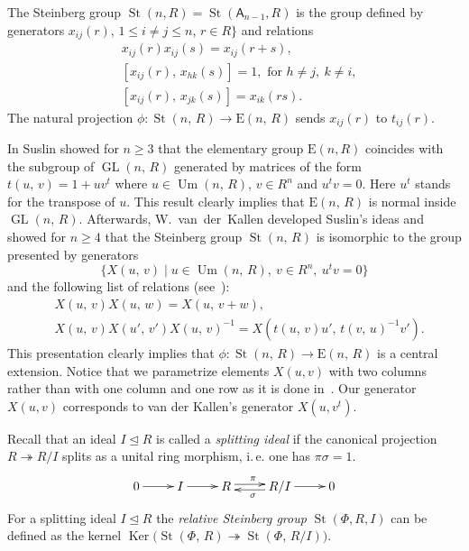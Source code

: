 \documentclass[11pt]{amsart}
\theoremstyle{plain} \declaretheorem[name=Theorem, Refname={Theorem,Theorems}]{tm} \Crefname{tm}{Theorem}{Theorems}
\numberwithin{equation}{section}
\theoremstyle{definition} \newtheorem{df}[lm]{Definition} \Crefname{df}{Definition}{Definitions}
\theoremstyle{remark} \newtheorem{rk}[lm]{Remark} \Crefname{rk}{Remark}{Remarks}
\newcommand{\Ker}{\mathop{\mathrm{Ker}}\nolimits}
\newcommand{\E}{{\mathrm{E}}}
\newcommand{\Um}{\mathop{\mathrm{Um}}\nolimits}
\newcommand{\St}{\mathop{\mathrm{St}}\nolimits}
\newcommand{\GL}{\mathop{\mathrm{GL}}\nolimits}
\newcommand{\epi}{\twoheadrightarrow}
\newcommand{\inv}{^{-1}}
\newcommand{\rA}{\mathsf{A}}
\begin{document}
The Steinberg group $\St(n, R) = \St(\rA_{n-1}, R)$ is the group defined by generators
$x_{ij}(r)$, $1\leq i\neq j\leq n$, $r\in R\}$ and relations
\setcounter{equation}{0}
\renewcommand{\theequation}{S\arabic{equation}}
\begin{align}
&x_{ij}(r)x_{ij}(s)=x_{ij}(r+s), \label{add0}\\
&[x_{ij}(r),\,x_{hk}(s)]=1,\text{ for }h\neq j,\ k\neq i, \label{ccf1}\\
&[x_{ij}(r),\,x_{jk}(s)]=x_{ik}(rs) \label{ccf2}.
\end{align}
The natural projection $\phi\colon\St(n,\,R)\rightarrow\E(n,\,R)$ sends $x_{ij}(r)$ to $t_{ij}(r)$.

In \cite{Sus} Suslin showed for $n\geq 3$ that the elementary group $\E(n, R)$ coincides with the subgroup of $\GL(n,\,R)$ generated by matrices
of the form $t(u,\,v)=1+uv^t$ where $u\in\Um(n,\,R)$, $v\in R^n$ and $u^tv=0$. Here $u^t$ stands for the transpose of $u$.
This result clearly implies that $\E(n,\,R)$ is normal inside $\GL(n,\,R)$.
Afterwards, W.~van~der~Kallen developed Suslin's ideas and showed for $n\geq4$ that the Steinberg group $\St(n,\,R)$ is isomorphic to the group presented by generators
$$\{X(u,\,v)\mid u\in\Um(n,\,R),\ v\in R^n,\ u^tv=0\}$$ and the following list of relations (see~\cite[Theorem~1]{vdK}):
\setcounter{equation}{0} \renewcommand{\theequation}{K\arabic{equation}}
\begin{align}
&X(u,\,v)X(u,\,w)=X(u,\,v+w), \label{add1} \\
&X(u,\,v)X(u',\,v')X(u,\,v)\inv=X(t(u,\,v)u',\,t(v,\,u)\inv v'). \label{conj1}
\end{align}
This presentation clearly implies that $\phi\colon\St(n,\,R)\rightarrow\E(n,\,R)$ is a central extension.
Notice that we parametrize elements $X(u, v)$ with two columns rather than with one column and one row as it is done in~\cite{vdK}.
Our generator $X(u,v)$ corresponds to van der Kallen's generator $X(u, v^t)$.

Recall that an ideal $I\trianglelefteq R$ is called a \emph{splitting ideal} if the canonical projection $R \twoheadrightarrow R/I$ splits as a unital ring morphism, i.\,e. one has $\pi\sigma=1$.
$$\xymatrix{0\ar@<0.1ex>[r]^{}&I\ar@<0.1ex>[r]^{}&R\ar@<0.5ex>[r]^{\pi}&R/I\ar@<0.5ex>[l]^{\sigma}\ar@<0.1ex>[r]^{}&0}$$
For a splitting ideal $I\trianglelefteq R$ the \emph{relative Steinberg group} $\St(\Phi, R, I)$ can be defined as the kernel $\Ker\big(\St(\Phi,\,R)\epi\St(\Phi,\,R/I)\big)$.
\end{document}
